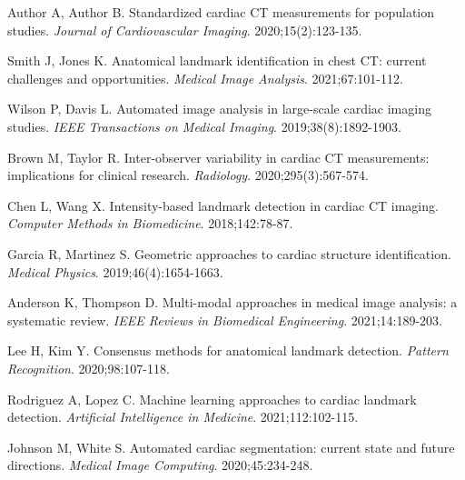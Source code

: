 \documentclass[11pt,a4paper]{article}
\begin{document}

\begin{thebibliography}{10}

Author A, Author B. Standardized cardiac CT measurements for population studies. \emph{Journal of Cardiovascular Imaging}. 2020;15(2):123-135.

Smith J, Jones K. Anatomical landmark identification in chest CT: current challenges and opportunities. \emph{Medical Image Analysis}. 2021;67:101-112.

Wilson P, Davis L. Automated image analysis in large-scale cardiac imaging studies. \emph{IEEE Transactions on Medical Imaging}. 2019;38(8):1892-1903.

Brown M, Taylor R. Inter-observer variability in cardiac CT measurements: implications for clinical research. \emph{Radiology}. 2020;295(3):567-574.

Chen L, Wang X. Intensity-based landmark detection in cardiac CT imaging. \emph{Computer Methods in Biomedicine}. 2018;142:78-87.

Garcia R, Martinez S. Geometric approaches to cardiac structure identification. \emph{Medical Physics}. 2019;46(4):1654-1663.

Anderson K, Thompson D. Multi-modal approaches in medical image analysis: a systematic review. \emph{IEEE Reviews in Biomedical Engineering}. 2021;14:189-203.

Lee H, Kim Y. Consensus methods for anatomical landmark detection. \emph{Pattern Recognition}. 2020;98:107-118.

Rodriguez A, Lopez C. Machine learning approaches to cardiac landmark detection. \emph{Artificial Intelligence in Medicine}. 2021;112:102-115.

Johnson M, White S. Automated cardiac segmentation: current state and future directions. \emph{Medical Image Computing}. 2020;45:234-248.

\end{thebibliography}
\end{document}
